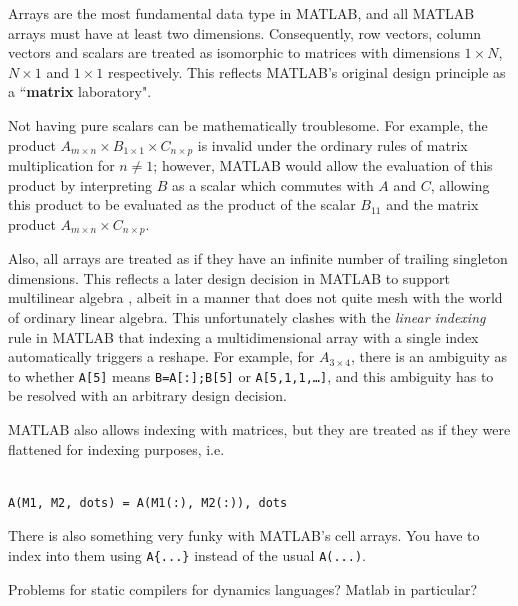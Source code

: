 \documentclass[preprint]{sigplanconf}
\newcommand{\MATLAB}{\textsc{MATLAB}}
\begin{document}
Arrays are the most fundamental data type in \MATLAB{}, and all \MATLAB{}
arrays must have at least two dimensions. Consequently, row vectors, column
vectors and scalars are treated as isomorphic to matrices with dimensions
$1\times N$, $N\times1$ and $1\times1$ respectively. This reflects \MATLAB's
original design principle as a ``\textbf{matrix} laboratory".

Not having pure scalars can be mathematically troublesome. For example, the
product $A_{m\times n} \times B_{1\times 1} \times C_{n\times p}$ is invalid
under the ordinary rules of matrix multiplication for $n\ne1$; however,
\MATLAB{} would allow the evaluation of this product by interpreting $B$ as a
scalar which commutes with $A$ and $C$, allowing this product to be evaluated
as the product of the scalar $B_{11}$ and the matrix product $A_{m\times n}
\times C_{n\times p}$.


Also, all arrays are treated as if they have an infinite number of trailing
singleton dimensions. This reflects a later design decision in \MATLAB{} to
support multilinear algebra \cite{matlabman:ma},  albeit in a manner that does
not quite mesh with the world of ordinary linear algebra. This unfortunately
clashes with the \textit{linear indexing} rule in \MATLAB{} that indexing a
multidimensional array with a single index automatically triggers a reshape.
For example, for $A_{3\times4}$, there is an ambiguity as to whether
\texttt{A[5]} means \texttt{B=A[:];B[5]} or \texttt{A[5,1,1,\dots]}, and this
ambiguity has to be resolved with an arbitrary design decision.

\MATLAB{} also allows indexing with matrices, but they are treated as if they
were flattened for indexing purposes, i.e.

\begin{verbatim}

A(M1, M2, dots) = A(M1(:), M2(:)), dots

\end{verbatim}

There is also something very funky with \MATLAB's cell arrays. You have to
index into them using \texttt{A\{...\}} instead of the usual \texttt{A(...)}.


Problems for static compilers for dynamics languages? Matlab in particular?
\end{document}

